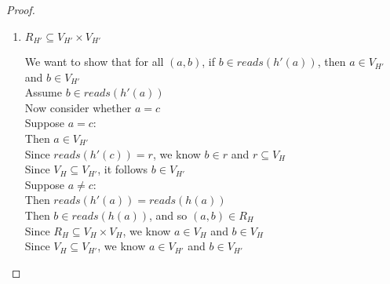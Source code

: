 \begin{proof}
\begin{enumerate}
\item $R_{H'} \subseteq V_{H'} \times V_{H'}$ 
  \begin{tabbedproof}
    \oo We want to show that for all $(a,b)$, if $b \in \mathit{reads}(h'(a))$, then $a \in V_{H'}$ and $b \in V_{H'}$ \\
    \oo Assume $b \in \mathit{reads}(h'(a))$ \\
    \ooo Now consider whether $a = c$  \\
    \ooo Suppose $a = c$: \\
    \oooo Then $a \in V_{H'}$ \\
    \oooo Since $\mathit{reads}(h'(c)) = r$, we know $b \in r$  and $r \subseteq V_H$ \\
    \oooo Since $V_{H} \subseteq V_{H'}$, it follows $b \in V_{H'}$ \\
    \ooo Suppose $a \not= c$: \\
    \oooo Then $\mathit{reads}(h'(a)) = \mathit{reads}(h(a))$ \\
    \oooo Then $b \in \mathit{reads}(h(a))$, and so $(a,b) \in R_H$ \\
    \oooo Since $R_H \subseteq V_H \times V_H$, we know $a \in V_H$ and $b \in V_H$ \\
    \oooo Since $V_{H} \subseteq V_{H'}$, we know $a \in V_{H'}$ and $b \in V_{H'}$ \\
  \end{tabbedproof}


\end{enumerate}
\end{proof}
